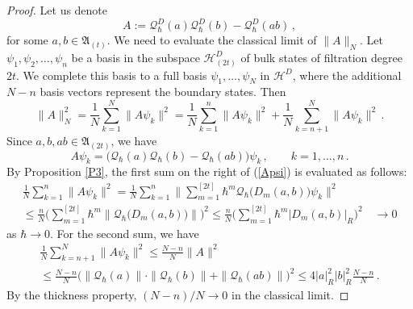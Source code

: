 \documentclass[12pt,a4paper]{article}
\numberwithin{equation}{section}
\theoremstyle{theorem}
\theoremstyle{remark}
\newcommand{\hh}{\mathcal{H}}
\newcommand{\qq}{\mathcal{Q}_{\hbar}}
\begin{document}
\begin{proof}
Let us denote
$$
A:=\qq^D(a)\qq^D(b)-\qq^D(ab)\,,
$$
for some $a,b\in \mathfrak{A}_{(t)}$. We need to evaluate the classical limit of $\|A\|_{N}$. Let $\psi_1,\psi_2,\ldots, \psi_n$ be a basis  in the subspace $\hh^D_{(2t)}$ of bulk states of filtration degree $2t$. We complete this basis to a full basis $\psi_1,\ldots, \psi_N$ in $\hh^D$, where the additional $N-n$ basis vectors represent the boundary states. Then 
\begin{equation}\label{Apsi}
\|A\|^2_N=\frac1N\sum_{k=1}^N\|A\psi_k\|^2=\frac1N\sum_{k=1}^n\|A\psi_k\|^2+\frac1N\sum_{k=n+1}^N\|A\psi_k\|^2\,.
\end{equation}
Since $a, b, ab\in \mathfrak{A}_{(2t)}$, we have 
\begin{equation}
    A\psi_k=\big(\qq(a)\qq(b)-\qq(ab)\big)\psi_k\,,\qquad k=1,\ldots,n\,.
\end{equation}
By Proposition \ref{P3}, the first sum on the right of (\ref{Apsi}) is evaluated as follows:
\begin{equation}
\begin{array}{c}
   \displaystyle \frac1N\sum_{k=1}^n\|A\psi_k\|^2= \frac1{N}\sum_{k=1}^n  \Big\| \sum_{m=1}^{[2t]}\hbar^{m}\qq\big(D_m(a,b)\big)\psi_k\Big\|^2\\[5mm]
 \displaystyle  \leq \frac{n}{N}\Big(\sum_{m=1}^{[2t]}\hbar^{m}\big\| \qq\big(D_m(a,b)\big)\big\|\Big)^2   \leq  \frac{n}{N}\Big(\sum_{m=1}^{[2t]}\hbar^{m}\big|D_m(a,b)\big|_R\Big)^2 \quad \longrightarrow 0
 \end{array}
    \end{equation}
as $\hbar\to 0$. For the second sum, we have 
\begin{equation}
\begin{array}{c}
\displaystyle \frac1N\sum_{k=n+1}^N\|A\psi_k\|^2\leq \frac{N-n}{N}\|A\|^2\\[5mm]
\displaystyle \leq \frac{N-n}N\big(\|\qq(a)\|\cdot \|\qq(b)\|+\|\qq(ab)\|\big)^2
\leq 4|a|^2_R|b|^2_R\frac{N-n}{N}\,.
\end{array}
\end{equation}
By the thickness property,  $(N-n)/N\rightarrow 0$ in the classical limit. 


\end{proof}
\end{document}
